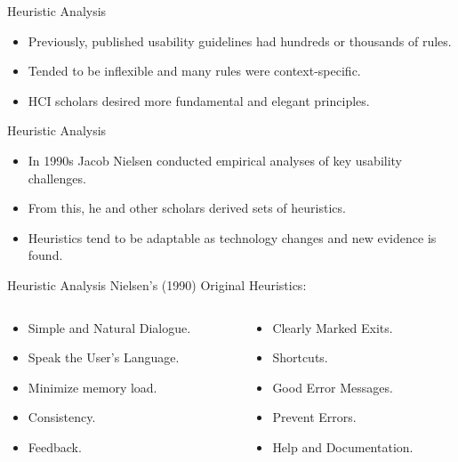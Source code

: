 \begin{frame}{Heuristic Analysis}
	\begin{itemize}
		\item Previously, published usability guidelines had hundreds or thousands of rules.
		\item Tended to be inflexible and many rules were context-specific.
		\item HCI scholars desired more fundamental and elegant principles.
	\end{itemize}
\end{frame}

\begin{frame}{Heuristic Analysis}
	\begin{itemize}
		\item In 1990s Jacob Nielsen conducted empirical analyses of key usability challenges.
		\item From this, he and other scholars derived sets of heuristics.
		\item Heuristics tend to be adaptable as technology changes and new evidence is found.
	\end{itemize}
\end{frame}

\begin{frame}{Heuristic Analysis}
Nielsen's (1990) Original Heuristics:

	\begin{columns}[onlytextwidth]
		\begin{column}{0.45\textwidth}
			\begin{itemize}
				\item Simple and Natural Dialogue.
				\item Speak the User's Language.
				\item Minimize memory load.
				\item Consistency.
				\item Feedback.
			\end{itemize}
		\end{column}
		\begin{column}{0.45\textwidth}				
			\begin{itemize}
				\item Clearly Marked Exits.
				\item Shortcuts.
				\item Good Error Messages.
				\item Prevent Errors.
				\item Help and Documentation.
			\end{itemize}
		\end{column}
	\end{columns}
\end{frame}

